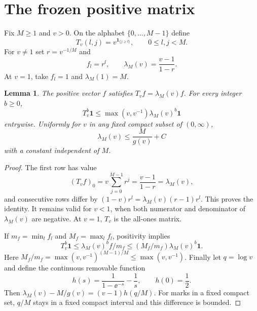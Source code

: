 \documentclass[11pt,a4paper]{article}
\newtheorem{lemma}[theorem]{Lemma}
\theoremstyle{remark}\newtheorem{remark}[theorem]{Remark}
\newcommand{\ind}{\mathbf 1}\newcommand{\wasc}{\operatorname{wasc}}\newcommand{\dasc}{\operatorname{dasc}}
\numberwithin{equation}{section}
\begin{document}
\section{The frozen positive matrix}\label{wasc:gr:sec:matrix}
Fix $M\ge1$ and $v>0$. On the alphabet $\{0,\ldots,M-1\}$ define
\begin{equation}\label{wasc:gr:eq:matrix}
T_v(l,j)=v^{\ind_{\{j\ge l\}}},\qquad 0\le l,j<M.
\end{equation}
For $v\ne1$ set $r=v^{-1/M}$ and
\begin{equation}\label{wasc:gr:eq:eigen}
f_l=r^l,\qquad \lambda_M(v)=\frac{v-1}{1-r}.
\end{equation}
At $v=1$, take $f_l=1$ and $\lambda_M(1)=M$.

\begin{lemma}\label{wasc:gr:lem:frozen}
The positive vector $f$ satisfies $T_vf=\lambda_M(v)f$. For every integer $b\ge0$,
\begin{equation}\label{wasc:gr:eq:matrixbound}
T_v^b\mathbf1\le\max(v,v^{-1})\lambda_M(v)^b\mathbf1
\end{equation}
entrywise. Uniformly for $v$ in any fixed compact subset of $(0,\infty)$,
\begin{equation}\label{wasc:gr:eq:eigenestimate}
\lambda_M(v)\le\frac{M}{g(v)}+C
\end{equation}
with a constant independent of $M$.
\end{lemma}
\begin{proof}
The first row has value
\[
(T_vf)_0=v\sum_{j=0}^{M-1}r^j=\frac{v-1}{1-r}=\lambda_M(v),
\]
and consecutive rows differ by $(1-v)r^l=\lambda_M(v)(r-1)r^l$. This proves the identity. It remains valid for $v<1$, when both numerator and denominator of $\lambda_M(v)$ are negative. At $v=1$, $T_v$ is the all-ones matrix.

If $m_f=\min_l f_l$ and $M_f=\max_l f_l$, positivity implies
\[
T_v^b\mathbf1\le \lambda_M(v)^b f/m_f
\le(M_f/m_f)\lambda_M(v)^b\mathbf1.
\]
Here $M_f/m_f=\max(v,v^{-1})^{(M-1)/M}\le\max(v,v^{-1})$.
Finally let $q=\log v$ and define the continuous removable function
\[
h(s)=\frac1{1-\ee^{-s}}-\frac1s,\qquad h(0)=\frac12.
\]
Then $\lambda_M(v)-M/g(v)=(v-1)h(q/M)$. For marks in a fixed compact set, $q/M$ stays in a fixed compact interval and this difference is bounded.
\end{proof}
\end{document}
